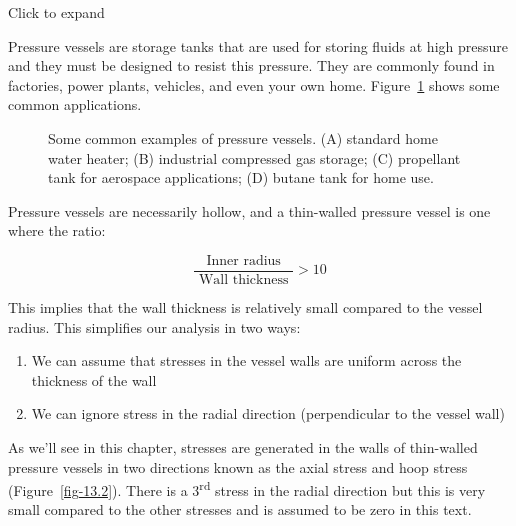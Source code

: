 \documentclass[
  letterpaper,
  DIV=11,
  numbers=noendperiod]{scrreprt}
\providecommand{\tightlist}{%
  \setlength{\itemsep}{0pt}\setlength{\parskip}{0pt}}\usepackage{longtable,booktabs,array}
\theoremstyle{definition}
\theoremstyle{remark}
\begin{document}

Click to expand

Pressure vessels are storage tanks that are used for storing fluids at
high pressure and they must be designed to resist this pressure. They
are commonly found in factories, power plants, vehicles, and even your
own home. Figure~\ref{fig-13.1} shows some common applications.

\begin{figure}


\caption{\label{fig-13.1}Some common examples of pressure vessels. (A)
standard home water heater; (B) industrial compressed gas storage; (C)
propellant tank for aerospace applications; (D) butane tank for home
use.}

\end{figure}%

Pressure vessels are necessarily hollow, and a thin-walled pressure
vessel is one where the ratio:

\[
\frac{\text { Inner radius }}{\text { Wall thickness }}>10
\]

This implies that the wall thickness is relatively small compared to the
vessel radius. This simplifies our analysis in two ways:

\begin{enumerate}
\def\labelenumi{\arabic{enumi}.}
\tightlist
\item
  We can assume that stresses in the vessel walls are uniform across the
  thickness of the wall
\item
  We can ignore stress in the radial direction (perpendicular to the
  vessel wall)
\end{enumerate}

As we'll see in this chapter, stresses are generated in the walls of
thin-walled pressure vessels in two directions known as the axial stress
and hoop stress (Figure~\ref{fig-13.2}). There is a
3\textsuperscript{rd} stress in the radial direction but this is very
small compared to the other stresses and is assumed to be zero in this
text.
\end{document}
